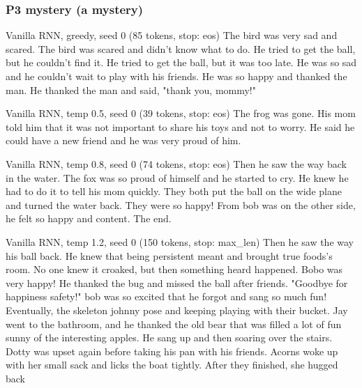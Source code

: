 \subsubsection*{P3 mystery (a mystery)}

\begin{modelout}{Vanilla RNN, greedy, seed 0 (85 tokens, stop: eos)}
\small The bird was very sad and scared. The bird was scared and didn't know what to do. He tried to get the ball, but he couldn't find it. He tried to get the ball, but it was too late. He was so sad and he couldn't wait to play with his friends. He was so happy and thanked the man. He thanked the man and said, "thank you, mommy!"
\end{modelout}

\begin{modelout}{Vanilla RNN, temp 0.5, seed 0 (39 tokens, stop: eos)}
\small The frog was gone. His mom told him that it was not important to share his toys and not to worry. He said he could have a new friend and he was very proud of him.
\end{modelout}

\begin{modelout}{Vanilla RNN, temp 0.8, seed 0 (74 tokens, stop: eos)}
\small Then he saw the way back in the water. The fox was so proud of himself and he started to cry. He knew he had to do it to tell his mom quickly. They both put the ball on the wide plane and turned the water back. They were so happy! From bob was on the other side, he felt so happy and content. The end.
\end{modelout}

\begin{modelout}{Vanilla RNN, temp 1.2, seed 0 (150 tokens, stop: max\_len)}
\small Then he saw the way his ball back. He knew that being persistent meant and brought true foods's room. No one knew it croaked, but then something heard happened. Bobo was very happy! He thanked the bug and missed the ball after friends. "Goodbye for happiness safety!" bob was so excited that he forgot and sang so much fun! Eventually, the skeleton johnny pose and keeping playing with their bucket. Jay went to the bathroom, and he thanked the old bear that was filled a lot of fun sunny of the interesting apples. He sang up and then soaring over the stairs. Dotty was upset again before taking his pan with his friends. Acorns woke up with her small sack and licks the boat tightly. After they finished, she hugged back
\end{modelout}

